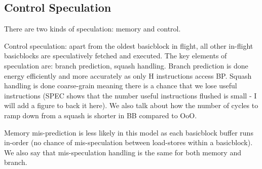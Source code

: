 \subsection{Control Speculation}
\label{sec:speculation}

There are two kinds of speculation: memory and control.

Control speculation: apart from the oldest basicblock in flight, all other
in-flight basicblocks are speculatively fetched and executed. The key elements
of speculation are: branch prediction, squash handling. Branch prediction is
done energy efficiently and more accurately as only H instructions access BP.
Squash handling is done coarse-grain meaning there is a chance that we lose
useful instructions (SPEC shows that the number useful instructions flushed is
small - I will add a figure to back it here). We also talk about how the number
of cycles to ramp down from a squash is shorter in BB compared to OoO.

Memory mis-prediction is less likely in this model as each basicblock buffer
runs in-order (no chance of mis-speculation between load-stores within a
basicblock). We also say that mis-speculation handling is the same for
both memory and branch.
